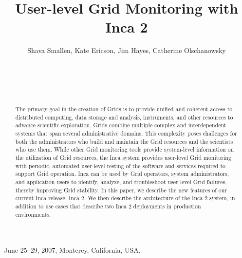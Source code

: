 \documentclass{sig-alternate}
\begin{document}
 {June 25--29, 2007, Monterey, California, USA.}

\title{User-level Grid Monitoring with Inca 2}


\author{
\alignauthor
Shava Smallen, Kate Ericson, Jim Hayes, Catherine Olschanowsky \\
 \\ 
 \\ 
\\ 
\\
}

\maketitle


\begin{abstract}
The primary goal in the creation of Grids is to provide unified and coherent
access to distributed computing, data storage and analysis, instruments, and
other resources to advance scientific exploration.  Grids combine multiple
complex and interdependent systems that span several administrative domains.
This complexity poses challenges for both the administrators who build and
maintain the Grid resources and the scientists who use them.  While other Grid
monitoring tools provide system-level information on the utilization of Grid
resources, the Inca system provides user-level Grid monitoring with periodic,
automated user-level testing of the software and services required to support
Grid operation.  Inca can be used by Grid operators, system administrators,
and application users to identify, analyze, and troubleshoot user-level Grid
failures, thereby improving Grid stability.  In this paper, we describe the new
features of our current Inca release, Inca 2.  We then describe the
architecture of the Inca 2 system, in addition to use cases that describe two
Inca 2 deployments in production environments.  
\end{abstract}
\end{document}

